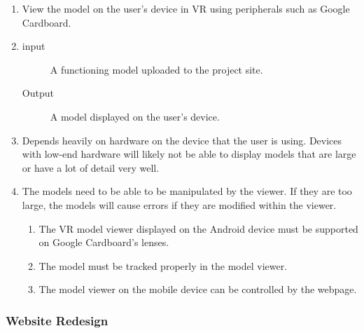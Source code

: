\documentclass[letterpaper, 10pt, draftclsnofoot, compsoc, onecolumn]{IEEEtran}
\begin{document}
\begin{enumerate}
	\item View the model on the user's device in VR using peripherals such as Google Cardboard.   

	\item
	\begin{description}
		\item[input] A functioning model uploaded to the project site.
		\item[Output] A model displayed on the user's device.
	\end{description}

	\item Depends heavily on hardware on the device that the user is using. Devices with low-end hardware will likely not be able to 
	display models that are large or have a lot of detail very well.  

	\item The models need to be able to be manipulated by the viewer. If they are too large, the models will cause errors if they are 
	modified within the viewer.  

	\begin{enumerate}
		\item The VR model viewer displayed on the Android device must be supported on Google Cardboard's lenses. 
		\item The model must be tracked properly in the model viewer. 
		\item The model viewer on the mobile device can be controlled by the webpage. 
	\end{enumerate} 
\end{enumerate}

\subsubsection{Website Redesign}
\end{document}
